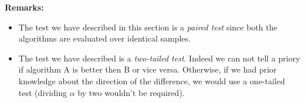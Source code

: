 \textbf{Remarks:}
\begin{itemize}
    \item The test we have described in this section is a \textit{paired test} since both the algorithms are evaluated over identical samples.
    \item The test we have described is a \textit{two-tailed test}. Indeed we can not tell a priory if algorithm A is better then B or vice versa. Otherwise, if we had prior knowledge about the direction of the difference, we would use a one-tailed test (dividing $\alpha$ by two wouldn't be required).
\end{itemize}